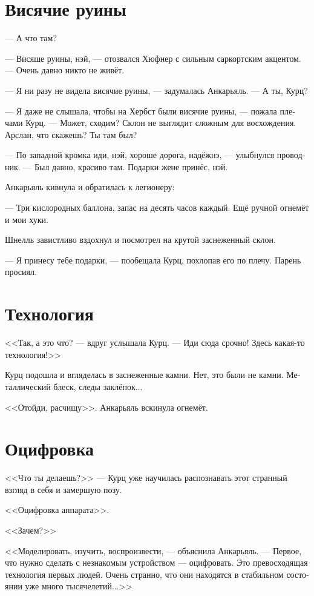 \documentclass[a4paper,12pt,fleqn]{book}\usepackage{polyglossia}\setdefaultlanguage[babelshorthands=true]{russian}\setotherlanguage{english}\defaultfontfeatures{Ligatures=TeX,Mapping=tex-text}\usepackage{xcolor}\newcommand{\ml}[3]{#2}
\begin{document}

\section{Висячие руины}

--- А что там?

--- Висяше руины, нэй, --- отозвался Хюфнер с сильным саркортским акцентом.
--- Очень давно никто не живёт.

--- Я ни разу не видела висячие руины, --- задумалась Анкарьяль.
--- А ты, Курц?

--- Я даже не слышала, чтобы на Хербст были висячие руины, --- пожала плечами Курц.
--- Может, сходим?
Склон не выглядит сложным для восхождения.
Арслан, что скажешь?
Ты там был?

--- По западной кромка иди, нэй, хороше дорога, надёжнэ, --- улыбнулся проводник.
--- Был давно, красиво там.
Подарки жене принёс, нэй.

Анкарьяль кивнула и обратилась к легионеру:

--- Три кислородных баллона, запас на десять часов каждый.
Ещё ручной огнемёт и мои хуки.

Шнелль завистливо вздохнул и посмотрел на крутой заснеженный склон.

--- Я принесу тебе подарки, --- пообещала Курц, похлопав его по плечу.
Парень просиял.

\section{Технология}

<<Так, а это что? --- вдруг услышала Курц.
--- Иди сюда срочно!
Здесь какая-то технология!>>

Курц подошла и вгляделась в заснеженные камни.
Нет, это были не камни.
Металлический блеск, следы заклёпок...

<<Отойди, расчищу>>.
Анкарьяль вскинула огнемёт.

\section{Оцифровка}

<<Что ты делаешь?>> --- Курц уже научилась распознавать этот странный взгляд в себя и замершую позу.

<<Оцифровка аппарата>>.

<<Зачем?>>

<<Моделировать, изучить, воспроизвести, --- объяснила Анкарьяль.
--- Первое, что нужно сделать с незнакомым устройством --- оцифровать.
Это превосходящая технология первых людей.
Очень странно, что они находятся в стабильном состоянии уже много тысячелетий...>>
\end{document}

